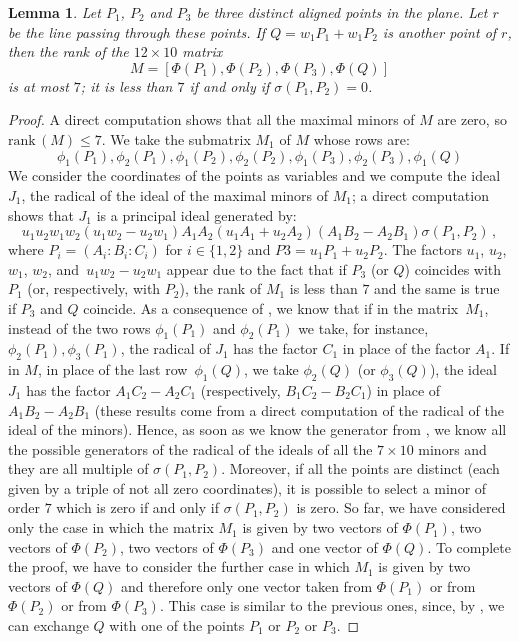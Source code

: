 \documentclass[12pt, a4paper, reqno, captions=tableheading,bibliography=totoc]{scrartcl}
\theoremstyle{plain}
\newtheorem{lemma}{Lemma}[section]
\theoremstyle{definition}
\begin{document}
\begin{lemma}
  Let $P_1$, $P_2$ and $P_3$ be three distinct aligned points in the plane.
  Let $r$ be the line passing through these points.
  If $Q = w_1 P_1 + w_1 P_2$ is another point of $r$,
  then the rank of the $12 \times 10$ matrix
  \begin{equation}
   M = \left[
    \Phi(P_1), \Phi(P_2), \Phi(P_3), \Phi(Q)
   \right]
  \end{equation}
  is at most $7$; it is less than $7$ if and only if $\sigma(P_1, P_2) = 0$.
\end{lemma}
\begin{proof}
  A direct computation shows that all the maximal minors of $M$ are
  zero, so $\mathrm{rank}\,(M) \leq 7$.
  We take the submatrix $M_1$ of $M$ whose rows are:
  \[
    \phi_1(P_1), \phi_2(P_1), \phi_1(P_2), \phi_2(P_2),
    \phi_1(P_3), \phi_2(P_3), \phi_1(Q)
  \]
  We consider the coordinates of the points as variables and we compute
  the ideal $J_1$, the radical of the ideal of the maximal minors of $M_1$;
  a direct computation shows that $J_1$ is a principal ideal generated by:
  \begin{equation}
  \label{eq:genJ1}
    u_1 u_2 w_1 w_2 (u_1w_2-u_2w_1) A_1 A_2 (u_1A_1+u_2A_2) (A_1B_2-A_2B_1) \sigma(P_1,P_2) \,,
  \end{equation}
  where $P_i = (A_i: B_i: C_i)$ for $i \in \{1,2\}$ and $P3 = u_1 P_1 + u_2 P_2$.
  The factors $u_1$, $u_2$, $w_1$, $w_2$, and~$u_1w_2-u_2w_1$ appear due to the fact that if
  $P_3$ (or $Q$) coincides with $P_1$ (or, respectively, with $P_2$),
  the rank of $M_1$ is less than $7$
  and the same is true if $P_3$ and $Q$ coincide.
  As a consequence of
  , we know that if in the matrix~$M_1$, instead of the two rows
  $\phi_1(P_1)$ and $\phi_2(P_1)$ we take, for instance,
  $\phi_2(P_1), \phi_3(P_1)$, the radical of $J_1$ has the factor
  $C_1$ in place of the factor $A_1$.
  If in $M$, in place of the last row~$\phi_1(Q)$, we take $\phi_2(Q)$ (or $\phi_3(Q)$), the ideal
  $J_1$ has the factor $A_1C_2-A_2C_1$ (respectively, $B_1C_2-B_2C_1$) in
  place of $A_1B_2-A_2B_1$ (these results come from a direct computation
  of the radical of the ideal of the minors).
  Hence, as soon as we know the generator from , we know all the
  possible generators of the radical of the ideals of all the $7\times 10$
  minors and they are all multiple of $\sigma(P_1, P_2)$. Moreover, if
  all the points are distinct (each given by a triple of not all zero
  coordinates), it is possible to select a minor of order $7$ which
  is zero if and only if $\sigma(P_1, P_2)$ is zero.
  So far, we have considered only the case in which the matrix
  $M_1$ is given by two vectors of $\Phi(P_1)$, two vectors of
  $\Phi(P_2)$, two vectors of $\Phi(P_3)$ and one vector of $\Phi(Q)$.
  To complete the proof, we have to consider the further case in which
  $M_1$ is given by two vectors of $\Phi(Q)$ and therefore only one
  vector taken from $\Phi(P_1)$ or from $\Phi(P_2)$ or from $\Phi(P_3)$.
  This case is similar to the previous ones, since, by
  , we can exchange $Q$ with one of the points
  $P_1$ or $P_2$ or $P_3$.
\end{proof}
\end{document}
